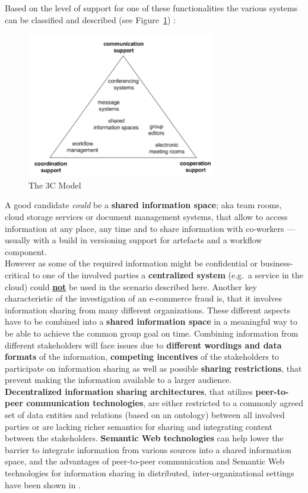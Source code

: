 Based on the level of support for one of these functionalities the various systems can be classified and described (see Figure~\ref{fig:images_3C_model}) \citep{Koch2008}:

\begin{figure}[H]
	\centering
		\includegraphics[height=2.5in]{images/3C-model.png}
	\caption{The 3C Model \citep{Koch2008}}
\label{fig:images_3C_model}
\end{figure}

A good candidate \textit{could} be a \textbf{shared information space}; aka team rooms, cloud storage services or document management systems, that allow to access information at any place,
any time and to share information with co-workers --- usually with a build in versioning support for artefacts and a workflow component. \\

However as some of the required information might be confidential or business-critical to one of the involved parties a \textbf{centralized system} (e.g.\ a service in the cloud) could \textbf{\underline{not}} be used in the scenario described here.
Another key characteristic of the investigation of an e-commerce fraud is, that it involves information sharing from many different organizations. These different aspects have to be combined into a \textbf{shared information space} in a meaningful way
to be able to achieve the common group goal on time. Combining information from different stakeholders will face issues due to \textbf{different wordings and data formats} of the information,
\textbf{competing incentives} of the stakeholders to participate on information sharing as well as possible \textbf{sharing restrictions}, that prevent making the information available to a larger audience. \\

\textbf{Decentralized information sharing architectures}, that utilizes \textbf{peer-to-peer communication technologies}, are either restricted to a commonly agreed set of data entities and relations (based on an ontology) between all involved parties
or are lacking richer semantics for sharing and integrating content between the stakeholders. \textbf{Semantic Web technologies} can help lower the barrier to integrate information from various sources into a shared information space,
and the advantages of peer-to-peer communication and Semantic Web technologies for information sharing in distributed, inter-organizational settings have been shown in \citep{Staab2006}. \\

